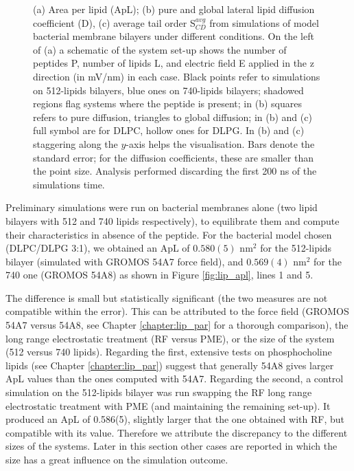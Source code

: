 \begin{figure}
\caption[ApL, D and S$_{CD}$ for atomistic membrane simulations]{(a) Area per lipid (ApL); (b) pure and global lateral lipid diffusion coefficient (D), (c) average tail order S$^{avg}_{CD}$ from simulations of model bacterial membrane bilayers under different conditions. On the left of (a) a schematic of the system set-up shows the number of peptides P, number of lipids L, and electric field E applied in the z direction (in mV/nm) in each case. 
%
Black points refer to simulations on 512-lipids bilayers, blue ones on 740-lipids bilayers; shadowed regions flag systems where the peptide is present; in (b) squares refers to pure diffusion, triangles to global diffusion; in (b) and (c) full symbol are for DLPC, hollow ones for DLPG.
In (b) and (c) staggering along the $y$-axis helps the visualisation.
%
Bars denote the standard error; for the diffusion coefficients, these are smaller than the point size. Analysis performed discarding the first 200 ns of the simulations time.}
\label{fig:lipids_ApL_D}
\end{figure}

Preliminary simulations were run on bacterial membranes alone (two lipid bilayers with 512 and 740 lipids respectively), to equilibrate them and compute their characteristics in absence of the peptide.
%
For the bacterial model chosen (DLPC/DLPG 3:1), we obtained an ApL of $0.580(5)$ nm$^2$ for the 512-lipids bilayer (simulated with GROMOS 54A7 force field), and  $0.569(4)$ nm$^2$ for the 740 one (GROMOS 54A8) as shown in Figure \ref{fig:lip_apl}, lines 1 and 5.

The difference is small but statistically significant (the two measures are not compatible within the error).
%
This can be attributed to the force field (GROMOS 54A7 versus 54A8, see Chapter \ref{chapter:lip_par} for a thorough comparison), the long range electrostatic treatment (RF versus PME), or the size of the system (512 versus 740 lipids). %
%
Regarding the first, extensive tests on phosphocholine lipids (see Chapter \ref{chapter:lip_par}) suggest that generally 54A8 gives larger ApL values than the ones computed with 54A7.
%
Regarding the second, a control simulation on the 512-lipids bilayer was run swapping the RF long range electrostatic treatment with PME (and maintaining the remaining set-up). It produced an ApL of 0.586(5), slightly larger that the one obtained with RF, but compatible with its value.
%
Therefore we attribute the discrepancy to the different sizes of the systems. Later in this section other cases are reported in which the size has a great influence on the simulation outcome.

